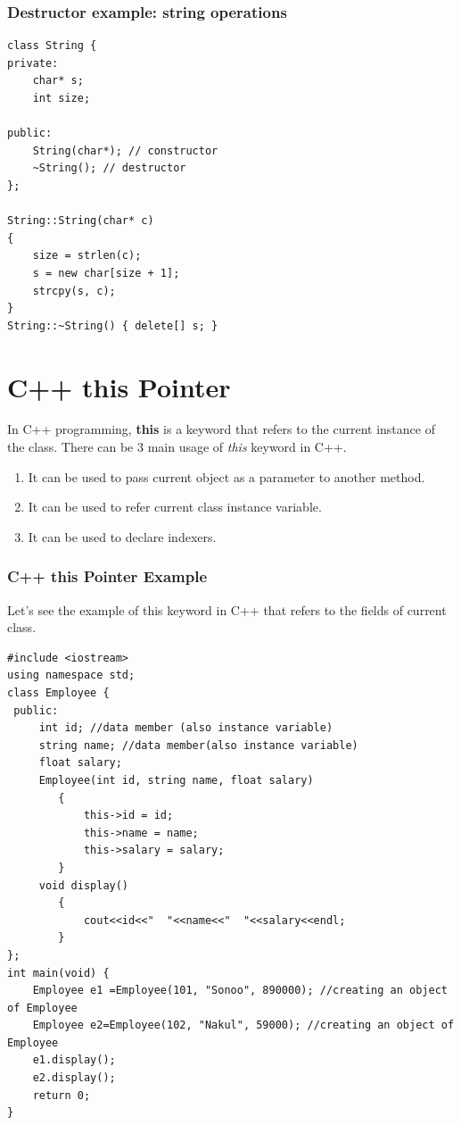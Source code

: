 \documentclass{book}
\begin{document}
\subsubsection{Destructor example: string operations}

\begin{lstlisting}
class String {
private:
	char* s;
	int size;
 
public:
	String(char*); // constructor
	~String(); // destructor
};
 
String::String(char* c)
{
	size = strlen(c);
	s = new char[size + 1];
	strcpy(s, c);
}
String::~String() { delete[] s; }
\end{lstlisting} 


\section{C++ this Pointer}

In C++ programming, \textbf{this} is a keyword that refers to the current instance of the class. There can be 3 main usage of \textit{this} keyword in C++.

\begin{enumerate}
	\item It can be used to pass current object as a parameter to another method.
\item It can be used to refer current class instance variable.
\item It can be used to declare indexers.
\end{enumerate}

\subsubsection{C++ this Pointer Example}

Let's see the example of this keyword in C++ that refers to the fields of current class.

\begin{lstlisting} 
#include <iostream>  
using namespace std;  
class Employee {  
 public:  
	 int id; //data member (also instance variable)      
	 string name; //data member(also instance variable)  
	 float salary;  
	 Employee(int id, string name, float salary)    
		{    
			this->id = id;    
			this->name = name;    
			this->salary = salary;   
		}    
	 void display()    
		{    
			cout<<id<<"  "<<name<<"  "<<salary<<endl;    
		}    
};  
int main(void) {  
    Employee e1 =Employee(101, "Sonoo", 890000); //creating an object of Employee   
    Employee e2=Employee(102, "Nakul", 59000); //creating an object of Employee  
    e1.display();    
    e2.display();    
    return 0;  
}  
\end{lstlisting} 
\end{document}

